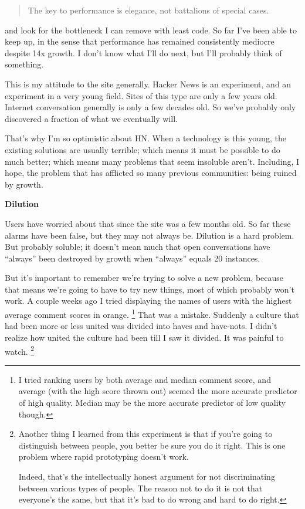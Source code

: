 \documentclass[12pt]{book}
\begin{document}
\begin{quote}
The key to performance is elegance, not battalions of special cases.
\end{quote}

and look for the bottleneck I can remove with least code. So far I've
been able to keep up, in the sense that performance has remained
consistently mediocre despite 14x growth. I don't know what I'll do
next, but I'll probably think of something.

This is my attitude to the site generally. Hacker News is an experiment,
and an experiment in a very young field. Sites of this type are only a
few years old. Internet conversation generally is only a few decades
old. So we've probably only discovered a fraction of what we eventually
will.

That's why I'm so optimistic about HN. When a technology is this young,
the existing solutions are usually terrible; which means it must be
possible to do much better; which means many problems that seem
insoluble aren't. Including, I hope, the problem that has afflicted so
many previous communities: being ruined by growth.

\textbf{Dilution}

Users have worried about that since the site was a few months old. So
far these alarms have been false, but they may not always be. Dilution
is a hard problem. But probably soluble; it doesn't mean much that open
conversations have ``always'' been destroyed by growth when ``always''
equals 20 instances.

But it's important to remember we're trying to solve a new problem,
because that means we're going to have to try new things, most of which
probably won't work. A couple weeks ago I tried displaying the names of
users with the highest average comment scores in orange.
\footnote{I tried ranking users by both average and median comment score,
and average (with the high score thrown out) seemed the more accurate
predictor of high quality. Median may be the more accurate predictor of
low quality though.} That was a mistake. Suddenly a culture that had
been more or less united was divided into haves and have-nots. I didn't
realize how united the culture had been till I saw it divided. It was
painful to watch. \footnote{Another thing I learned from this experiment is that if you're
going to distinguish between people, you better be sure you do it right.
This is one problem where rapid prototyping doesn't work.

Indeed, that's the intellectually honest argument for not discriminating
between various types of people. The reason not to do it is not that
everyone's the same, but that it's bad to do wrong and hard to do right.}
\end{document}
